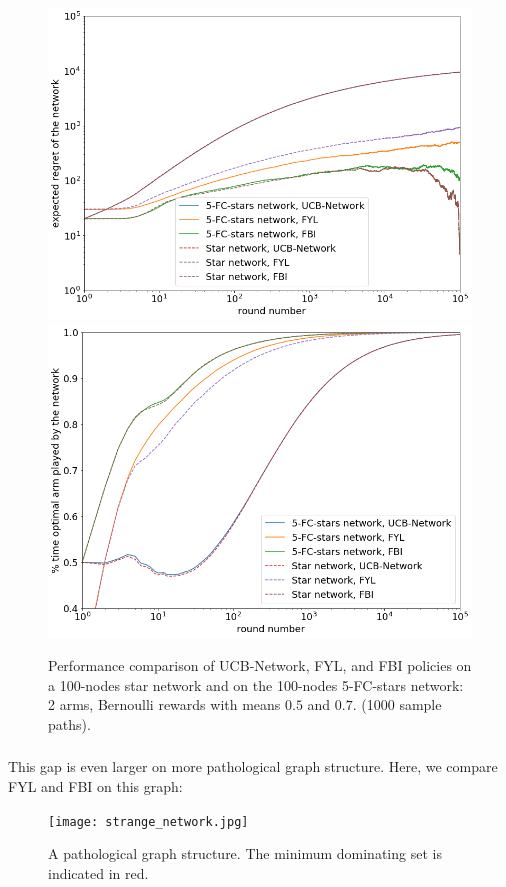 \documentclass{article}
\begin{document}
\begin{figure}[H]
  \centering
  \includegraphics[width=0.49\linewidth]{fig4_1.png}
  \includegraphics[width=0.49\linewidth]{fig4_2.png}
  \caption{Performance comparison of UCB-Network, FYL, and FBI policies on a 100-nodes star network and on the 100-nodes 5-FC-stars network: 2 arms, Bernoulli rewards with means $0.5$ and $0.7$. (1000 sample paths).}
\end{figure}


\subsubsection{}

This gap is even larger on more pathological graph structure. Here, we compare FYL and FBI on this graph:

\begin{figure}[H]
  \centering
  \texttt{[image: strange\_network.jpg]}
  \caption{A pathological graph structure. The minimum dominating set is indicated in red.}
\end{figure}
\end{document}
